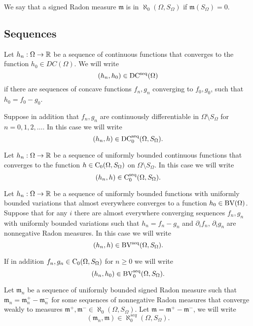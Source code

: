 We say that a signed Radon measure $\mathfrak m$ is in
$\aleph_0(\Omega,S_\Omega)$ if $\mathfrak m(S_\Omega)=0$.



\subsection{Sequences}
Let $h_n:\Omega\to\mathbb{R}$ be a sequence of continuous functions that
converges to the function $h_0\in DC(\Omega)$.
We will write 
$$(h_n,h_0)\in \operatorname{DC^{seq}}(\Omega)$$
if
there are sequences of concave functions $f_n,g_n$ converging to
$f_0,g_0$, such that 
$h_0=f_0-g_0$.

Suppose in addition that 
$f_n,g_n$ are  continuously differentiable in
$\Omega\setminus S_\Omega$ for $n=0,1,2,\dots$.
In this case we will write 
$$(h_n,h)\in \operatorname{DC_0^{seq}}(\Omega,S_\Omega).$$



Let $h_n:\Omega\to\mathbb{R}$ be a sequence of
uniformly bounded continuous 
functions
that
converges  to the function $h\in \operatorname{C_0}(\Omega,S_\Omega)$
 on
$\Omega\setminus S_\Omega$.
In this case we will write 
$$(h_n,h)\in \operatorname{C_0^{seq}}(\Omega,S_\Omega).$$

Let $h_n:\Omega\to\mathbb{R}$ be a sequence of uniformly bounded functions
with uniformly bounded variations
that
almost everywhere converges  to a function $h_0\in\operatorname{BV}(\Omega)$.
 Suppose that for any $i$ there are
 almost everywhere converging  sequences
 $f_n, g_n$ with uniformly bounded variations
  such that 
 $h_n=f_n- g_n$ and
 $\partial_i f_n$,
 $\partial_i  g_n$ are
 nonnegative Radon measures.
  In this case we will write 
$$(h_n,h)\in \operatorname{BV^{seq}}(\Omega,S_\Omega).$$

If in addition $f_n, g_n\in\operatorname{C_0}(\Omega,S_\Omega)$ for
$n\ge 0$ we
will write 
$$(h_n,h_0)\in \operatorname{BV_0^{seq}}(\Omega,S_\Omega).$$





Let $\mathfrak m_n$ be
  a sequence of uniformly bounded
signed Radon measure  such that
$\mathfrak m_n=\mathfrak m_n^+-\mathfrak m_n^-$
for some
sequences of nonnegative Radon measures
that converge weakly to measures $\mathfrak m^+,
\mathfrak m^-\in\aleph_0(\Omega,S_\Omega)$.
Let $\mathfrak m=\mathfrak m^+-\mathfrak m^-$,
we will write
$$(\mathfrak m_n,\mathfrak m)\in\aleph_0^{seq}(\Omega,S_\Omega).$$


